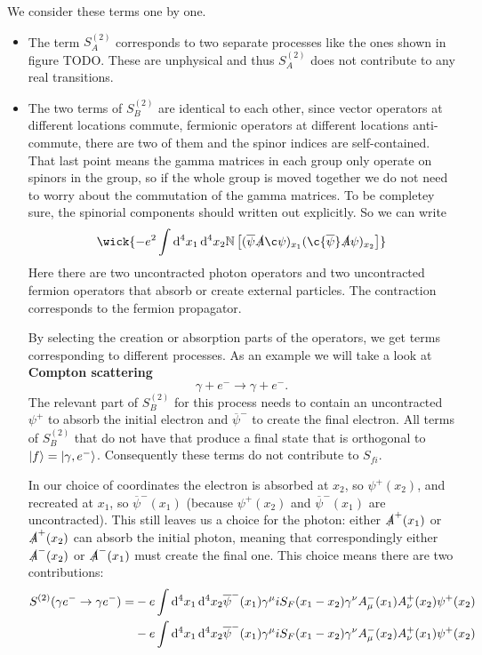 We consider these terms one by one.
\begin{itemize}
\item The term $S^{(2)}_A$ corresponds to two separate processes like the ones shown in figure TODO. These are unphysical and thus $S^{(2)}_A$ does not contribute to any real transitions.
\item The two terms of $S^{(2)}_B$ are identical to each other, since vector operators at different locations commute, fermionic operators at different locations anti-commute, there are two of them and the spinor indices are self-contained. That last point means the gamma matrices in each group only operate on spinors in the group, so if the whole group is moved together we do not need to worry about the commutation of the gamma matrices. To be completey sure, the spinorial components should written out explicitly. So we can write
\[ \wick{-e^2\int \diff{^4x_1}\diff{^4x_2} \N \left[(\overline{\psi}\slashed{A}\c\psi)_{x_1}(\c{\overline{\psi}}\slashed{A}\psi)_{x_2}\right]} \]
Here there are two uncontracted photon operators and two uncontracted fermion operators that absorb or create external particles. The contraction corresponds to the fermion propagator.

By selecting the creation or absorption parts of the operators, we get terms corresponding to different processes. As an example we will take a look at \textbf{Compton scattering}
\[ \gamma + e^- \to \gamma + e^-. \]
The relevant part of $S^{(2)}_B$ for this process needs to contain an uncontracted $\psi^+$ to absorb the initial electron and $\overline{\psi}^-$ to create the final electron. All terms of $S^{(2)}_B$ that do not have that produce a final state that is orthogonal to $\left| f \right\rangle = \left| \gamma,e^- \right\rangle$. Consequently these terms do not contribute to $S_{fi}$.

In our choice of coordinates the electron is absorbed at $x_2$, so $\psi^+(x_2)$, and recreated at $x_1$, so $\overline{\psi}^-(x_1)$ (because $\psi^+(x_2)$ and $\overline{\psi}^-(x_1)$ are uncontracted). This still leaves us a choice for the photon: either $\slashed{A}^+(x_1)$ or $\slashed{A}^+(x_2)$ can absorb the initial photon, meaning that correspondingly either $\slashed{A}^-(x_2)$ or $\slashed{A}^-(x_1)$ must create the final one. This choice means there are two contributions:
\begin{align*}
S^{(2)}(\gamma e^- \to \gamma e^-)  = & - e \int \operatorname{d \!}{^4x_1}\operatorname{d \!}{^4x_2}\overline{\psi}^-(x_1)\gamma^\mu iS_F(x_1-x_2)\gamma^\nu A^-_\mu(x_1)A^+_\nu(x_2)\psi^+(x_2) \\
& - e \int \operatorname{d \!}{^4x_1}\operatorname{d \!}{^4x_2}\overline{\psi}^-(x_1)\gamma^\mu iS_F(x_1-x_2)\gamma^\nu A^-_\mu(x_2)A^+_\nu(x_1)\psi^+(x_2)
\end{align*}


\end{itemize}
